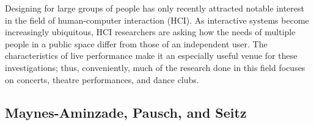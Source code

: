 Designing for large groups of people has only recently attracted notable interest in the field of human-computer interaction (HCI). As interactive systems become increasingly ubiquitous, HCI researchers are asking how the needs of multiple people in a public space differ from those of an independent user. The characteristics of live performance make it an especially useful venue for these investigations; thus, conveniently, much of the research done in this field focuses on concerts, theatre performances, and dance clubs.

\subsection{Maynes-Aminzade, Pausch, and Seitz}

